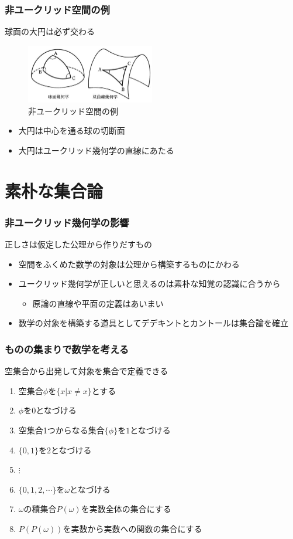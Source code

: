 \documentclass[unicode, 14pt, aspectratio=169]{beamer}
\begin{document}
\begin{frame}
  \frametitle{非ユークリッド空間の例}
  {\large 球面の大円は必ず交わる}
  \begin{figure}
    \includegraphics[width=0.5\textwidth]{images/non-euclid.png}
    \caption{非ユークリッド空間の例}
  \end{figure}
  \begin{itemize}
  \item 大円は中心を通る球の切断面
  \item 大円はユークリッド幾何学の直線にあたる
  \end{itemize}
\end{frame}
\section{素朴な集合論}
\begin{frame}
  \frametitle{非ユークリッド幾何学の影響}
  {\large 正しさは仮定した公理から作りだすもの}
  \begin{itemize}
  \item 空間をふくめた数学の対象は公理から構築するものにかわる
  \item ユークリッド幾何学が正しいと思えるのは素朴な知覚の認識に合うから
    \begin{itemize}
    \item 原論の直線や平面の定義はあいまい
    \end{itemize}
  \item 数学の対象を構築する道具としてデデキントとカントールは集合論を確立
  \end{itemize}
\end{frame}
\begin{frame}
  \frametitle{ものの集まりで数学を考える}
  {\large 空集合から出発して対象を集合で定義できる}
  \begin{enumerate}
  \item 空集合$\phi$を$\{x|x\neq x\}$とする
  \item $\phi$を$0$となづける
  \item 空集合1つからなる集合$\{\phi\}$を$1$となづける
  \item $\{0, 1\}$を$2$となづける
  \item $\vdots$
  \item $\{0, 1, 2, \cdots\}$を$\omega$となづける
  \item $\omega$の積集合$P(\omega)$を実数全体の集合にする
  \item $P(P(\omega))$を実数から実数への関数の集合にする
  \end{enumerate}
\end{frame}
\end{document}
